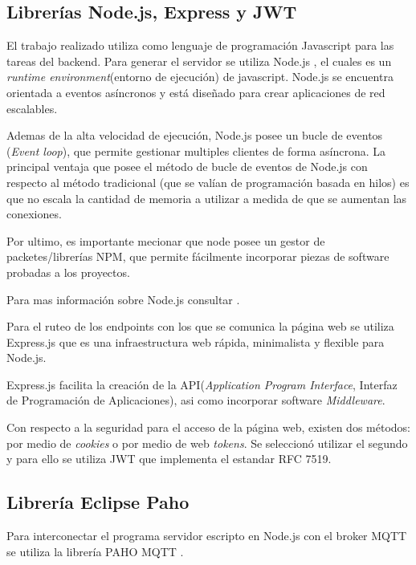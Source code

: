 \subsection{Librerías Node.js, Express y JWT}
\label{subsec: Node}
El trabajo realizado utiliza como lenguaje de programación  Javascript para las tareas del backend. Para generar el servidor se utiliza Node.js \citep{WEBSITE:20}, el cuales es un \textit{runtime environment}(entorno de ejecución) de javascript. Node.js se encuentra orientada a eventos asíncronos y está diseñado para crear aplicaciones de red escalables.

Ademas de la alta velocidad de ejecución, Node.js posee un bucle de eventos (\textit{Event loop}), que permite gestionar multiples clientes de forma asíncrona. La principal ventaja que posee el método de bucle de eventos de Node.js con respecto al método tradicional (que se valían de programación basada en hilos) es que no escala la cantidad de memoria a utilizar a medida de que se aumentan las conexiones.

Por ultimo, es importante mecionar que node posee un gestor de packetes/librerías NPM, que permite fácilmente incorporar piezas de software probadas a los proyectos.

Para mas información sobre Node.js consultar \citep{WEBSITE:20}.


Para el ruteo de los endpoints con los que se comunica la página web se utiliza Express.js \citep{WEBSITE:21} que es una infraestructura web rápida, minimalista y flexible para Node.js. 

Express.js facilita la creación de la API(\textit{Application Program Interface}, Interfaz de Programación de Aplicaciones), asi como incorporar software \textit{Middleware}. 

Con respecto a la seguridad para el acceso de la página web, existen dos métodos: por medio de \textit{cookies} o por medio de web \textit{tokens}. Se seleccionó utilizar el segundo y para ello se utiliza JWT \citep{WEBSITE:22} que implementa el estandar RFC 7519. 




\subsection{Librería Eclipse Paho}
\label{subsec: Paho}

Para interconectar el programa servidor escripto en Node.js con el broker MQTT se utiliza la librería PAHO MQTT \citep{WEBSITE:23}.

